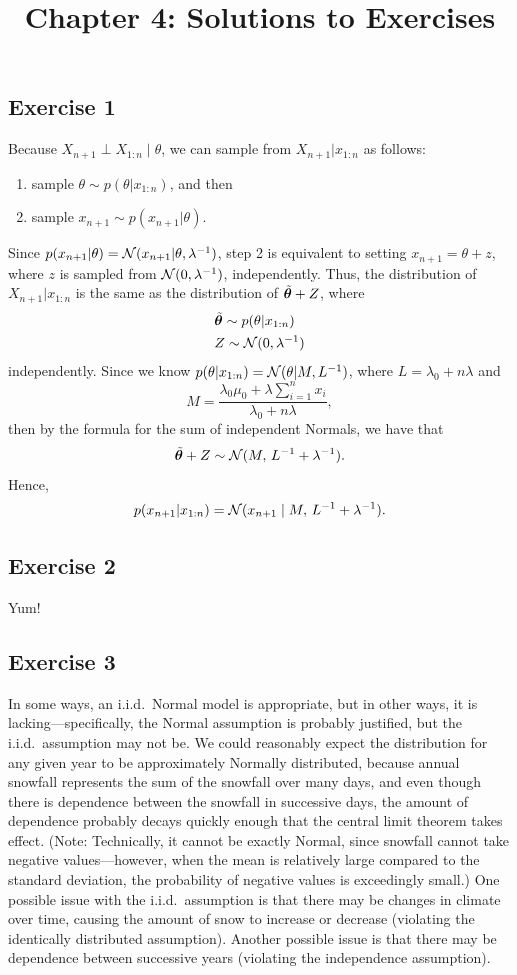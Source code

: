 \documentclass[12pt]{article}
\title{Chapter 4: Solutions to Exercises}
\author{}
\date{}
\begin{document}
\maketitle
\thispagestyle{firststyle}

\subsection*{Exercise 1}
Because $X_{n+1}\perp X_{1:n}\mid \theta$, we can sample from $X_{n+1}|x_{1:n}$ as follows:
\begin{enumerate}
    \item sample $\theta\sim p(\theta|x_{1:n})$, and then
    \item sample $x_{n+1}\sim p(x_{n+1}|\theta)$.
\end{enumerate}
Since $p(x_{n+1}|\theta) = \mathcal{N}(x_{n+1}|\theta,\lambda^{-1})$, 
step 2 is equivalent to setting $x_{n+1} = \theta + z$, where $z$ is sampled from $\mathcal{N}(0,\lambda^{-1})$, independently.
Thus, the distribution of $X_{n+1}|x_{1:n}$ is the same as the distribution of $\tilde{{\bm\theta}} + Z$, where
\begin{align*}
    & \tilde{{\bm\theta}}\sim p(\theta|x_{1:n})\\
    & Z\sim\mathcal{N}(0,\lambda^{-1})
\end{align*}
independently. Since we know $p(\theta|x_{1:n})=\mathcal{N}(\theta|M,L^{-1})$, where $L = \lambda_0 + n\lambda$ and 
$$M =\frac{\lambda_0\mu_0+\lambda\sum_{i = 1}^n x_i}{\lambda_0+ n\lambda},$$
then by the formula for the sum of independent Normals, we have that
$$ \tilde{{\bm\theta}} + Z \sim \mathcal{N}(M,\,L^{-1}+\lambda^{-1}).$$
Hence, 
$$ p(x_{n+1}|x_{1:n}) = \mathcal{N}(x_{n+1}\mid M,\,L^{-1}+\lambda^{-1}).$$


\subsection*{Exercise 2}

Yum!

\subsection*{Exercise 3}
In some ways, an i.i.d.\ Normal model is appropriate, but in other ways, it is lacking---specifically, the Normal assumption is probably justified, but the i.i.d.\ assumption may not be.  We could reasonably expect the distribution for any given year to be approximately Normally distributed, because annual snowfall represents the sum of the snowfall over many days, and even though there is dependence between the snowfall in successive days, the amount of dependence probably decays quickly enough that the central limit theorem takes effect.  (Note: Technically, it cannot be exactly Normal, since snowfall cannot take negative values---however, when the mean is relatively large compared to the standard deviation, the probability of negative values is exceedingly small.) One possible issue with the i.i.d.\ assumption is that there may be changes in climate over time, causing the amount of snow to increase or decrease (violating the identically distributed assumption). Another possible issue is that there may be dependence between successive years (violating the independence assumption).
\end{document}
